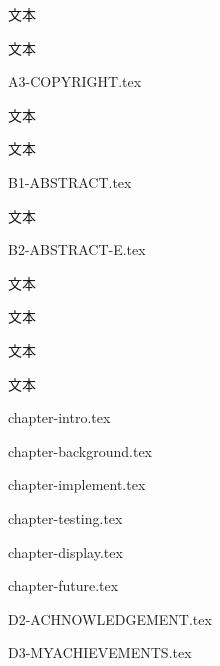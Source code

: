 \documentclass[12pt,openany,a4paper,fancyhdr,oneside]{ctexbook}
\begin{document}



\clearpage{\pagestyle{plain}\cleardoublepage}
\textcolor[rgb]{1,1,1}{文本} 








\clearpage{\pagestyle{plain}\cleardoublepage}
\textcolor[rgb]{1,1,1}{文本} 

 {A3-COPYRIGHT.tex}



\clearpage{\pagestyle{plain}\cleardoublepage}
\textcolor[rgb]{1,1,1}{文本} 



\clearpage{\pagestyle{plain}\cleardoublepage}
\textcolor[rgb]{1,1,1}{文本} 


\newpage
{}
\pagestyle{plain}
 {B1-ABSTRACT.tex}

\clearpage{\pagestyle{plain}\cleardoublepage}
\textcolor[rgb]{1,1,1}{文本} 

 {B2-ABSTRACT-E.tex}



\clearpage{\pagestyle{plain}\cleardoublepage}
\textcolor[rgb]{1,1,1}{文本} 

\setcounter{tocdepth}{2}
\tableofcontents


\clearpage{\pagestyle{plain}\cleardoublepage}
\textcolor[rgb]{1,1,1}{文本} 




\clearpage{\pagestyle{plain}\cleardoublepage}
\textcolor[rgb]{1,1,1}{文本} 


%


\clearpage{\pagestyle{plain}\cleardoublepage}
\textcolor[rgb]{1,1,1}{文本} 

\newpage
{}
\pagestyle{fancy}



\setlength{\baselineskip}{25pt}  %

 {chapter-intro.tex}



 {chapter-background.tex}




 {chapter-implement.tex}

 {chapter-testing.tex}


 {chapter-display.tex}

 {chapter-future.tex}

\clearpage





\pagestyle{plain}
\clearpage
{}
{}
 {D2-ACHNOWLEDGEMENT.tex}
\pagestyle{plain}


\clearpage
{}
{}
 {D3-MYACHIEVEMENTS.tex}


\printindex
\end{document}
